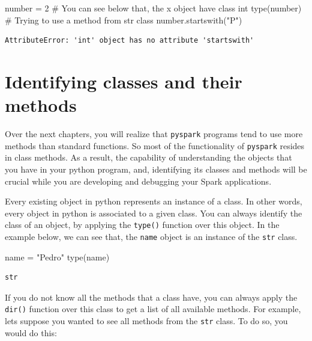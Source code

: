 \documentclass[
  11pt,
  letterpaper,
  DIV=11,
  numbers=noendperiod]{scrreprt}
\newenvironment{Shaded}{\begin{snugshade}}{\end{snugshade}}
\newcommand{\BuiltInTok}[1]{\textcolor[rgb]{0.00,0.23,0.31}{#1}}
\newcommand{\CommentTok}[1]{\textcolor[rgb]{0.37,0.37,0.37}{#1}}
\newcommand{\DecValTok}[1]{\textcolor[rgb]{0.68,0.00,0.00}{#1}}
\newcommand{\NormalTok}[1]{\textcolor[rgb]{0.00,0.23,0.31}{#1}}
\newcommand{\OperatorTok}[1]{\textcolor[rgb]{0.37,0.37,0.37}{#1}}
\newcommand{\StringTok}[1]{\textcolor[rgb]{0.13,0.47,0.30}{#1}}
\begin{document}
\begin{Shaded}
\begin{Highlighting}[]
\NormalTok{number }\OperatorTok{=} \DecValTok{2}
\CommentTok{\# You can see below that, the \textasciigrave{}x\textasciigrave{} object have class \textasciigrave{}int\textasciigrave{}}
\BuiltInTok{type}\NormalTok{(number)}
\CommentTok{\# Trying to use a method from \textasciigrave{}str\textasciigrave{} class}
\NormalTok{number.startswith(}\StringTok{"P"}\NormalTok{)}
\end{Highlighting}
\end{Shaded}

\begin{verbatim}
AttributeError: 'int' object has no attribute 'startswith'
\end{verbatim}

\section{Identifying classes and their
methods}\label{identifying-classes-and-their-methods}

Over the next chapters, you will realize that \texttt{pyspark} programs
tend to use more methods than standard functions. So most of the
functionality of \texttt{pyspark} resides in class methods. As a result,
the capability of understanding the objects that you have in your python
program, and, identifying its classes and methods will be crucial while
you are developing and debugging your Spark applications.

Every existing object in python represents an instance of a class. In
other words, every object in python is associated to a given class. You
can always identify the class of an object, by applying the
\texttt{type()} function over this object. In the example below, we can
see that, the \texttt{name} object is an instance of the \texttt{str}
class.

\begin{Shaded}
\begin{Highlighting}[]
\NormalTok{name }\OperatorTok{=} \StringTok{"Pedro"}
\BuiltInTok{type}\NormalTok{(name)}
\end{Highlighting}
\end{Shaded}

\begin{verbatim}
str
\end{verbatim}

If you do not know all the methods that a class have, you can always
apply the \texttt{dir()} function over this class to get a list of all
available methods. For example, lets suppose you wanted to see all
methods from the \texttt{str} class. To do so, you would do this:
\end{document}
